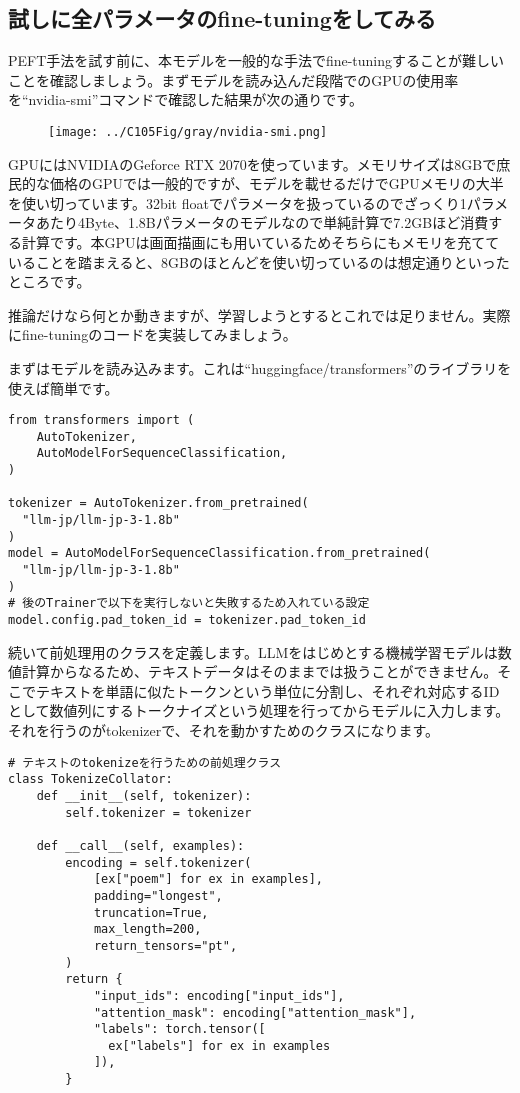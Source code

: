 \documentclass[a5paper,twoside,dvipdfmx]{jsarticle}
\begin{document}
\subsection{試しに全パラメータのfine-tuningをしてみる}

PEFT手法を試す前に、本モデルを一般的な手法でfine-tuningすることが難しいことを確認しましょう。まずモデルを読み込んだ段階でのGPUの使用率を``nvidia-smi''コマンドで確認した結果が次の通りです。

\begin{figure}[h]
  \centering
  \texttt{[image: ../C105Fig/gray/nvidia-smi.png]}
 \end{figure} 

GPUにはNVIDIAのGeforce RTX 2070を使っています。メモリサイズは8GBで庶民的な価格のGPUでは一般的ですが、モデルを載せるだけでGPUメモリの大半を使い切っています。32bit floatでパラメータを扱っているのでざっくり1パラメータあたり4Byte、1.8Bパラメータのモデルなので単純計算で7.2GBほど消費する計算です。本GPUは画面描画にも用いているためそちらにもメモリを充てていることを踏まえると、8GBのほとんどを使い切っているのは想定通りといったところです。

推論だけなら何とか動きますが、学習しようとするとこれでは足りません。実際にfine-tuningのコードを実装してみましょう。

まずはモデルを読み込みます。これは``huggingface/transformers''のライブラリを使えば簡単です。

\begin{lstlisting}
from transformers import (
    AutoTokenizer,
    AutoModelForSequenceClassification,
)

tokenizer = AutoTokenizer.from_pretrained(
  "llm-jp/llm-jp-3-1.8b"
)
model = AutoModelForSequenceClassification.from_pretrained(
  "llm-jp/llm-jp-3-1.8b"
)
# 後のTrainerで以下を実行しないと失敗するため入れている設定
model.config.pad_token_id = tokenizer.pad_token_id

\end{lstlisting}

続いて前処理用のクラスを定義します。LLMをはじめとする機械学習モデルは数値計算からなるため、テキストデータはそのままでは扱うことができません。そこでテキストを単語に似たトークンという単位に分割し、それぞれ対応するIDとして数値列にする\textsf{トークナイズ}という処理を行ってからモデルに入力します。それを行うのがtokenizerで、それを動かすためのクラスになります。

\begin{lstlisting}
# テキストのtokenizeを行うための前処理クラス
class TokenizeCollator:
    def __init__(self, tokenizer):
        self.tokenizer = tokenizer

    def __call__(self, examples):
        encoding = self.tokenizer(
            [ex["poem"] for ex in examples],
            padding="longest",
            truncation=True,
            max_length=200,
            return_tensors="pt",
        )
        return {
            "input_ids": encoding["input_ids"],
            "attention_mask": encoding["attention_mask"],
            "labels": torch.tensor([
              ex["labels"] for ex in examples
            ]),
        }

\end{lstlisting}
\end{document}
